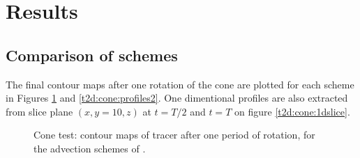 \section{Results}

\subsection{Comparison of schemes}

The final contour maps after one rotation of the cone are plotted for each scheme in Figures \ref{t2d:cone:profiles1} and \ref{t2d:cone:profiles2}. One dimentional profiles are also extracted from
slice plane $(x,y=10,z)$ at $t=T/2$ and $t=T$ on figure \ref{t2d:cone:1dslice}.

\newpage

\begin{figure}[H]
\begin{minipage}[t]{0.50\textwidth}
 \centering
\end{minipage}%
\begin{minipage}[t]{0.50\textwidth}
 \centering
\end{minipage}
\begin{minipage}[t]{0.50\textwidth}
 \centering
\end{minipage}
\begin{minipage}[t]{0.50\textwidth}
 \centering
\end{minipage}
\begin{minipage}[t]{0.50\textwidth}
 \centering
\end{minipage}%
\begin{minipage}[t]{0.50\textwidth}
 \centering
\end{minipage}
\begin{minipage}[t]{0.50\textwidth}
 \centering
\end{minipage}%
\begin{minipage}[t]{0.50\textwidth}
 \centering
\end{minipage} 
  \caption{Cone test: contour maps of tracer after one period of rotation, for the advection schemes of .}
 \label{t2d:cone:profiles1}
\end{figure}

